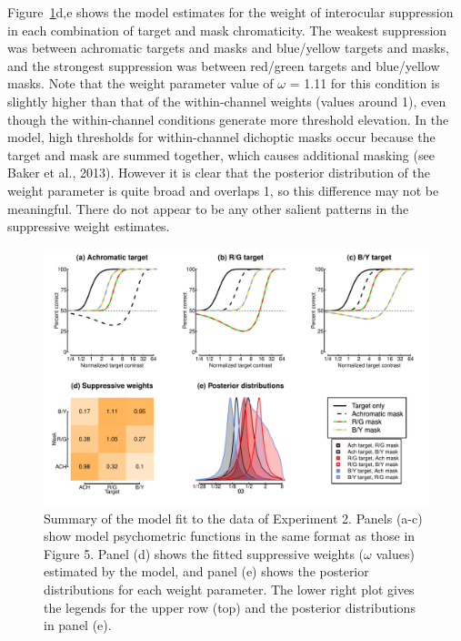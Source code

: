 \documentclass[
  letterpaper,
  DIV=11,
  numbers=noendperiod]{scrartcl}
\begin{document}
Figure~\ref{fig-MCSmodel}d,e shows the model estimates for the weight of
interocular suppression in each combination of target and mask
chromaticity. The weakest suppression was between achromatic targets and
masks and blue/yellow targets and masks, and the strongest suppression
was between red/green targets and blue/yellow masks. Note that the
weight parameter value of \(\omega\) = 1.11 for this condition is
slightly higher than that of the within-channel weights (values around
1), even though the within-channel conditions generate more threshold
elevation. In the model, high thresholds for within-channel dichoptic
masks occur because the target and mask are summed together, which
causes additional masking (see Baker et al., 2013). However it is clear
that the posterior distribution of the weight parameter is quite broad
and overlaps 1, so this difference may not be meaningful. There do not
appear to be any other salient patterns in the suppressive weight
estimates.

\begin{figure}

{\centering \includegraphics{Figures/MCSmodel.pdf}

}

\caption{\label{fig-MCSmodel}Summary of the model fit to the data of
Experiment 2. Panels (a-c) show model psychometric functions in the same
format as those in Figure 5. Panel (d) shows the fitted suppressive
weights (\(\omega\) values) estimated by the model, and panel (e) shows
the posterior distributions for each weight parameter. The lower right
plot gives the legends for the upper row (top) and the posterior
distributions in panel (e).}

\end{figure}
\end{document}
